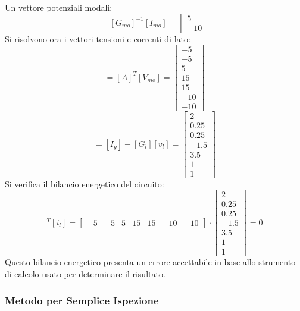 \documentclass{article}
\numberwithin{equation}{subsection}
\begin{document}
Un vettore potenziali modali:
\begin{equation*}
    [V_{mo}]=[G_{mo}]^{-1}[I_{mo}]=\begin{bmatrix}
        5\\
        -10
    \end{bmatrix}
\end{equation*}
Si risolvono ora i vettori tensioni e correnti di lato:
\begin{equation*}
    [v_l]=[A]^T[V_{mo}]=\begin{bmatrix}
        -5\\
        -5\\
        5\\
        15\\
        15\\
        -10\\
        -10
    \end{bmatrix}
\end{equation*}
\begin{equation*}
    [i_l]=[I_g]-[G_l][v_l]=\begin{bmatrix}
        2\\
        0.25\\
        0.25\\
        -1.5\\
        3.5\\
        1\\
        1
    \end{bmatrix}
\end{equation*}
Si verifica il bilancio energetico del circuito:
\begin{equation*}
    [v_l]^T[i_l]=\begin{bmatrix}
        -5&
        -5&
        5&
        15&
        15&
        -10&
        -10
    \end{bmatrix}\cdot\begin{bmatrix}
        2\\
        0.25\\
        0.25\\
        -1.5\\
        3.5\\
        1\\
        1
    \end{bmatrix}
    =0
\end{equation*}
Questo bilancio energetico presenta un errore accettabile in base allo strumento di calcolo usato per determinare il risultato. 

\subsubsection{Metodo per Semplice Ispezione}
\end{document}
